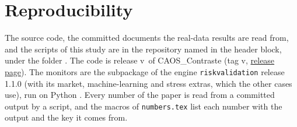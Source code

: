 \section{Reproducibility}
\label{sec:reproducibility}

The source code, the committed documents the real-data results are read from, and the scripts of this study are in the repository named in the header block, under the folder . The code is release v\nProductRelease\ of CAOS\_Contraste (tag v\nProductRelease, \href{https://github.com/fsantibanezleal/CAOS_Contraste/releases/tag/v\nProductRelease}{release page}). The monitors are the subpackage  of the engine \texttt{riskvalidation} release 1.1.0 (with its market, machine-learning and stress extras, which the other cases use), run on Python \nPythonVersion. Every number of the paper is read from a committed output by a script, and the macros of \texttt{numbers.tex} list each number with the output and the key it comes from.

